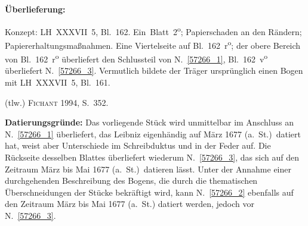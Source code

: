 %  
%
%
%
%
\frenchspacing
%
\begin{ledgroupsized}[r]{120mm}
\footnotesize
\pstart
\noindent\textbf{Überlieferung:}
\pend
\end{ledgroupsized}
%
\begin{ledgroupsized}[r]{114mm}
\footnotesize
\pstart \parindent -6mm
%
Konzept: LH~XXXVII~5, Bl.~162.
Ein~Blatt~2\textsuperscript{o};
Papierschaden an den Rändern;
Papiererhaltungsmaßnahmen.
Eine Viertelseite auf Bl.~162~r\textsuperscript{o};
der obere Bereich von Bl.~162~r\textsuperscript{o} überliefert den Schlussteil von N.~\ref{57266_1}, Bl.~162~v\textsuperscript{o} überliefert N.~\ref{57266_3}.
Vermutlich bildete der Träger ursprünglich einen Bogen mit LH~XXXVII~5, Bl.~161.
\pend
\end{ledgroupsized}
%
\begin{ledgroupsized}[r]{114mm}
\footnotesize
\pstart
\parindent -6mm
%
(tlw.) \cite{01056}\textsc{Fichant} 1994, S.~352.
\pend%
\end{ledgroupsized}
%
%
\vspace{5mm}
\begin{ledgroup}
\footnotesize
\pstart
\noindent%
\textbf{Datierungsgründe:}
Das vorliegende Stück wird unmittelbar im Anschluss an N.~\ref{57266_1} überliefert, das Leibniz eigenhändig auf März 1677 (a.\ St.)\ datiert hat, weist aber Unterschiede im Schreibduktus und in der Feder auf.
%
Die Rückseite desselben Blattes überliefert wiederum N.~\ref{57266_3}, das sich auf den Zeitraum März bis Mai 1677 (a.\ St.)\ datieren lässt. 
%
Unter der Annahme einer durchgehenden Beschreibung des Bogens, die durch die thematischen Überschneidungen der Stücke bekräftigt wird,
%
kann N.~\ref{57266_2} ebenfalls auf den Zeitraum März bis Mai 1677 (a.\ St.) datiert werden, jedoch vor N.~\ref{57266_3}.
\pend
%
\end{ledgroup}
%
%
\frenchspacing
\vspace{8mm}
\pstart%
\normalsize%
\noindent%
